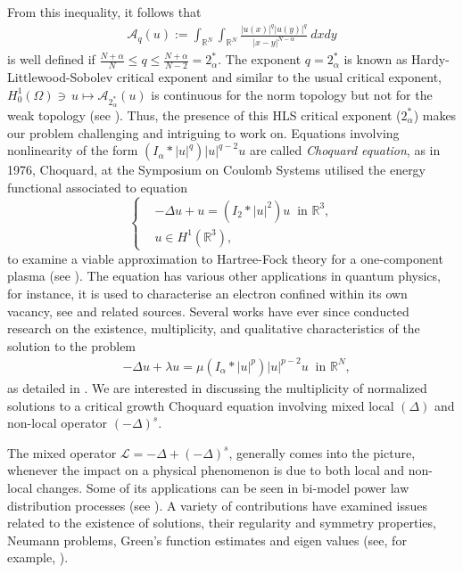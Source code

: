 \documentclass[11pt]{article}
\numberwithin{equation}{section}
\numberwithin{mytheorem}{section}
\begin{document}
	\noindent From this inequality, it follows that 
	\begin{align*}
		{\mathcal{A}_q(u):=	\int_{\mathbb R^N}\int_{\mathbb R^N}\frac{|u(x)|^{q}|u(y)|^{q}}{|x-y|^{N-\alpha}}~dxdy}
	\end{align*}
	is well defined if $\frac{N+\alpha}{N}\leq q \leq \frac{N+\alpha}{N-2}=2^*_{\alpha} $. The exponent $q = 2^*_{\alpha}$ is known as Hardy-Littlewood-Sobolev critical exponent and similar to the usual critical exponent, $H^1_0(\Omega)\ni\, u\mapsto \mathcal{A}_{2^*_\alpha}(u)$ is continuous for the norm topology but not for the weak topology (see \cite{Moroz2017guide}). Thus, the presence of this HLS critical exponent ($2^*_{\alpha}$) makes our problem challenging and intriguing to work on. Equations involving nonlinearity of the form $(I_{\alpha}*|u|^q)|u|^{q-2}u$ are called {\it Choquard equation}, as in 1976, Choquard, at the Symposium on Coulomb Systems  
	utilised the energy functional associated to equation 
	\begin{equation}
		\left\{ \begin{array}{rl}   	
			& 	-\Delta u  +  u = (I_2*|u|^2)u\;\;\text{in } \mathbb{R}^3,\\
			&  	u \in H^1(\mathbb{R}^3),
		\end{array}
		\right.
	\end{equation}
	to examine a viable approximation to Hartree-Fock theory for a one-component plasma (see \cite{lieb1977existence}). The equation has various other applications in quantum physics, for instance, it is used to characterise an electron confined within its own vacancy, see \cite{penrose1996gravity} and related sources. Several works have ever since conducted research on the existence, multiplicity, and qualitative characteristics of the solution to the problem 
	\begin{equation}\label{Norm_Choq}
		\begin{array}{rl}   	
			& 	-\Delta u  +  \lambda u =\mu (I_\alpha*|u|^p)|u|^{p-2}u\;\;\text{in } \mathbb{R}^N,
		\end{array}
	\end{equation}
	as detailed in \cite{filippucci2020singular, Moroz2013groundstates, liu2022another}. We are interested in discussing the multiplicity of normalized solutions to a critical growth Choquard equation involving mixed local $(\Delta)$ and non-local operator $(-\Delta)^s$. 
	
	The mixed operator $\mathcal{L}=-\Delta+(-\Delta)^s$, generally comes into the picture, whenever the impact on a physical phenomenon is due to both local and non-local changes. Some of its applications can be seen in bi-model power law distribution processes (see \cite{pagnini2021should}). A variety of contributions have examined issues related to the existence of solutions, their regularity and symmetry properties, Neumann problems, Green's function estimates and eigen values (see, for example, \cite{biagi2021global,biagi2022mixed,abatangelo2021elliptic,arora2021combined,Divya2019Eigenvalue}).
	
\end{document}
